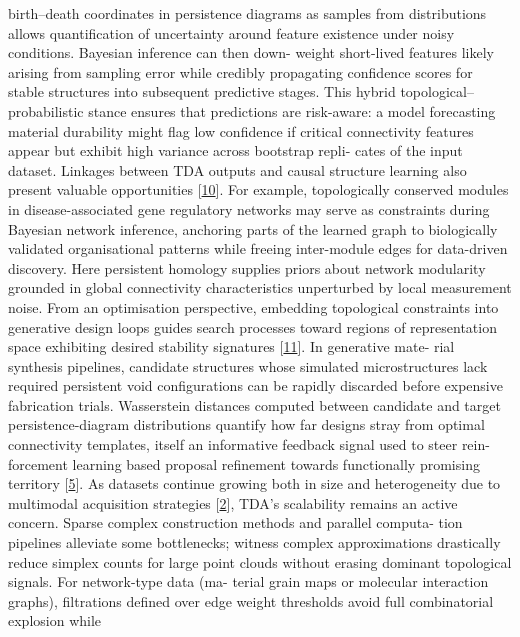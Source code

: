 \documentclass[
]{article}
\begin{document}
birth--death coordinates in persistence diagrams as samples from
distributions allows quantification of uncertainty around feature
existence under noisy conditions. Bayesian inference can then down-
weight short-lived features likely arising from sampling error while
credibly propagating confidence scores for stable structures into
subsequent predictive stages. This hybrid topological--probabilistic
stance ensures that predictions are risk-aware: a model forecasting
material durability might flag low confidence if critical connectivity
features appear but exhibit high variance across bootstrap repli- cates
of the input dataset. Linkages between TDA outputs and causal structure
learning also present valuable opportunities
{[}\protect\hyperlink{_bookmark50}{10}{]}. For example, topologically
conserved modules in disease-associated gene regulatory networks may
serve as constraints during Bayesian network inference, anchoring parts
of the learned graph to biologically validated organisational patterns
while freeing inter-module edges for data-driven discovery. Here
persistent homology supplies priors about network modularity grounded in
global connectivity characteristics unperturbed by local measurement
noise. From an optimisation perspective, embedding topological
constraints into generative design loops guides search processes toward
regions of representation space exhibiting desired stability signatures
{[}\protect\hyperlink{_bookmark51}{11}{]}. In generative mate- rial
synthesis pipelines, candidate structures whose simulated
microstructures lack required persistent void configurations can be
rapidly discarded before expensive fabrication trials. Wasserstein
distances computed between candidate and target persistence-diagram
distributions quantify how far designs stray from optimal connectivity
templates, itself an informative feedback signal used to steer rein-
forcement learning based proposal refinement towards functionally
promising territory {[}\protect\hyperlink{_bookmark45}{5}{]}. As
datasets continue growing both in size and heterogeneity due to
multimodal acquisition strategies
{[}\protect\hyperlink{_bookmark42}{2}{]}, TDA's scalability remains an
active concern. Sparse complex construction methods and parallel
computa- tion pipelines alleviate some bottlenecks; witness complex
approximations drastically reduce simplex counts for large point clouds
without erasing dominant topological signals. For network-type data (ma-
terial grain maps or molecular interaction graphs), filtrations defined
over edge weight thresholds avoid full combinatorial explosion while
\end{document}
